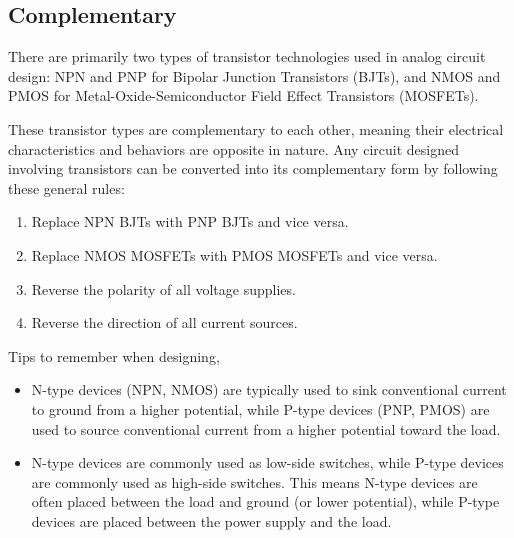 \subsection{Complementary}\label{sec:theory_general_complementary}

There are primarily two types of transistor technologies used in
analog circuit design: NPN and PNP for Bipolar Junction Transistors
(BJTs), and NMOS and PMOS for Metal-Oxide-Semiconductor Field
Effect Transistors (MOSFETs).

These transistor types are complementary to each other, meaning
their electrical characteristics and behaviors are opposite in
nature. Any circuit designed involving transistors can be converted
into its complementary form by following these general rules:

\begin{enumerate}
  \item Replace NPN BJTs with PNP BJTs and vice versa.
  \item Replace NMOS MOSFETs with PMOS MOSFETs and vice versa.
  \item Reverse the polarity of all voltage supplies.
  \item Reverse the direction of all current sources.
\end{enumerate}

\noindent Tips to remember when designing,
\begin{itemize}
  \item N-type devices (NPN, NMOS) are typically used to
  sink conventional current to ground from a higher potential,
  while P-type devices (PNP, PMOS) are used to source conventional
  current from a higher potential toward the load.
  \item N-type devices are commonly used as low-side switches,
  while P-type devices are commonly used as high-side switches.
  This means N-type devices are often placed between the load
  and ground (or lower potential), while P-type devices are placed
  between the power supply and the load.
\end{itemize}

